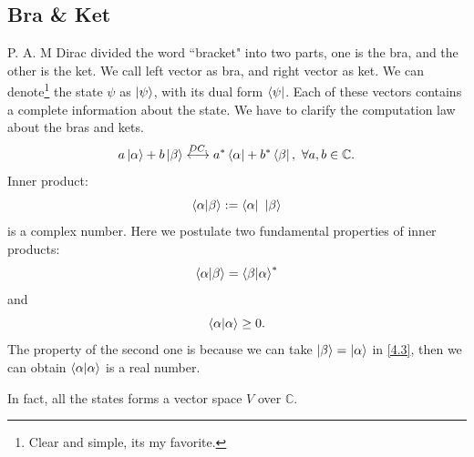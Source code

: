\documentclass{article}
\theoremstyle{1}
\begin{document}
\subsection{Bra \& Ket}
\quad
P. A. M Dirac divided the word ``bracket" into two parts, one is the bra, and the other is the ket. We call left vector as bra, and right vector as ket. We can denote\footnote{Clear and simple, its my favorite.} the state $\psi$ as $\ket{\psi}$, with its dual form $\bra{\psi}$. Each of these vectors contains a complete information about the state. We have to clarify the computation law about the bras and kets.
\begin{equation}
   a\ket{\alpha}+b\ket{\beta} \overset{DC.}{\longleftrightarrow}a^*\bra{\alpha}+b^*\bra{\beta}, \ \forall a,b\in \mathbb{C}.
\end{equation}
Inner product:
\begin{equation}
    \braket{\alpha}{\beta}:=\bra{\alpha} \ \ket{\beta}
\end{equation}
is a complex number.
Here we postulate two fundamental properties of inner products:
\begin{equation}\label{4.3}
    \braket{\alpha}{\beta}=\braket{\beta}{\alpha}^*
\end{equation}
and 
\begin{equation}
    \braket{\alpha}{\alpha}\ge 0.
\end{equation}
\quad 
The property of the second one is because we can take $\ket{\beta}=\ket{\alpha}$ in \eqref{4.3}, then we can obtain $\braket{\alpha}{\alpha}$ is a real number.


In fact, all the states forms a vector space $V$ over $\mathbb{C}$.
\end{document}
